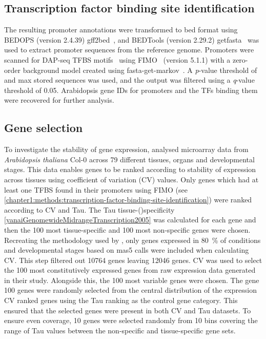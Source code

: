 \documentclass[../main.tex]{subfiles}
\begin{document}
\subsection{Transcription factor binding site identification}
\label{chapter1:methods:transcription-factor-binding-site-identification}
The resulting promoter annotations were transformed to bed format using BEDOPS (version 2.4.39) gff2bed~\autocite{nephBEDOPSHighperformanceGenomic2012}, and BEDTools (version 2.29.2) getfasta~\autocite{quinlanBEDToolsFlexibleSuite2010} was used to extract promoter sequences from the reference genome.
Promoters were scanned for DAP\hyp{}seq TFBS motifs~\autocite{omalleyCistromeEpicistromeFeatures2016} using FIMO~\autocite{grantFIMOScanningOccurrences2011} (version 5.1.1) with a zero\hyp{}order background model created using fasta\hyp{}get\hyp{}markov~\autocite{baileyMEMESuiteTools2009}.
A \textit{p}\hyp{}value threshold of  and max stored sequences  was used, and the output was filtered using a \textit{q}\hyp{}value threshold of 0.05.
Arabidopsis gene IDs for promoters and the TFs binding them were recovered for further analysis.

\subsection{Gene selection}\label{chapter1:methods:gene-selection}

To investigate the stability of gene expression, \textcite*{czechowskiGenomeWideIdentificationTesting2005} analysed microarray data from \textit{Arabidopsis thaliana} Col-0 across 79 different tissues, organs and developmental stages.
This data enables genes to be ranked according to stability of expression across tissues using coefficient of variation (CV) values.
Only genes which had at least one TFBS found in their promoters using FIMO (see \autoref{chapter1:methods:transcription-factor-binding-site-identification}) were ranked according to CV and Tau.
The Tau tissue\hyp()specificity \autoref{yanaiGenomewideMidrangeTranscription2005} was calculated for each gene and then the 100 most tissue\hyp{}specific and 100 most non\hyp{}specific genes were chosen.
Recreating the methodology used by \textcite*{czechowskiGenomeWideIdentificationTesting2005}, only genes expressed in \SI{80}{\percent} of conditions and developmental stages based on mas5 calls were included when calculating CV.
This step filtered out 10764 genes leaving 12046 genes.
CV was used to select the 100 most constitutively expressed genes from raw expression data generated in their study.
Alongside this, the 100 most variable genes were chosen.
The gene
100 genes were randomly selected from the central distribution of the expression CV ranked genes using the Tau ranking as the control gene category.
This ensured that the selected genes were present in both CV and Tau datasets.
To ensure even coverage, 10 genes were selected randomly from 10 bins covering the range of Tau values between the non\hyp{}specific and tissue\hyp{}specific gene sets.
\end{document}
